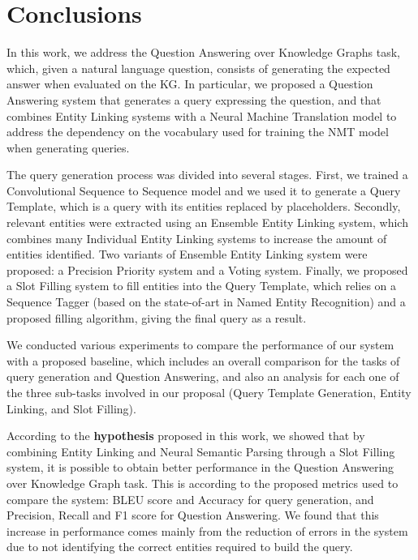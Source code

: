 \chapter{Conclusions}
\label{cap6:conclusions}
In this work, we address the Question Answering over Knowledge Graphs task, which, given a natural 
language question, consists of generating the expected answer when evaluated on the KG. In particular, 
we proposed a Question Answering system that generates a \SPARQL{} query expressing the question, and that 
combines Entity Linking systems with a Neural Machine Translation model to address the dependency on the 
vocabulary used for training the NMT model when generating \SPARQL{} queries.

The \SPARQL{} query generation process was divided into several stages. First, we trained a 
Convolutional Sequence to Sequence model and we used it to generate a Query Template, which is a 
\SPARQL{} query with its entities replaced by placeholders. Secondly, relevant entities were extracted 
using an Ensemble Entity Linking system, which combines many Individual Entity Linking systems to 
increase the amount of entities identified. Two variants of Ensemble Entity Linking system were 
proposed: a Precision Priority system and a Voting system. Finally, we proposed a Slot Filling system 
to fill entities into the Query Template, which relies on a Sequence Tagger (based on the 
state-of-art in Named Entity Recognition) and a proposed filling algorithm, giving the final \SPARQL{} 
query as a result.

We conducted various experiments to compare the performance of our system with a proposed baseline, 
which includes an overall comparison for the tasks of \SPARQL{} query generation and Question Answering, 
and also an analysis for each one of the three sub-tasks involved in our proposal (Query Template 
Generation, Entity Linking, and Slot Filling).

According to the \textbf{hypothesis} proposed in this work, we showed that by combining Entity 
Linking and Neural Semantic Parsing through a Slot Filling system, it is possible to obtain better 
performance in the Question Answering over Knowledge Graph task. This is according to the proposed 
metrics used to compare the system: BLEU score and Accuracy for \SPARQL{} query generation, and Precision, 
Recall and F1 score for Question Answering. We found that this increase in performance comes mainly 
from the reduction of errors in the system due to not identifying the correct entities required to 
build the \SPARQL{} query.

